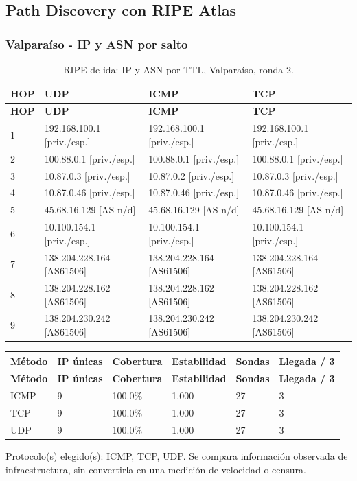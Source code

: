 \subsection{Path Discovery con RIPE Atlas}\label{sec:ripe}
\subsubsection{Valparaíso - IP y ASN por salto}
\begingroup
\fontsize{9}{11}\selectfont
\begin{longtable}{p{0.95cm}p{4.716666666666667cm}p{4.716666666666667cm}p{4.716666666666667cm}}
\caption{RIPE de ida: IP y ASN por TTL, Valparaíso, ronda 2.}\label{ripe:138.204.230.242} \\
\toprule
\textbf{HOP} & \textbf{UDP} & \textbf{ICMP} & \textbf{TCP} \\ \midrule
\endfirsthead
\toprule
\textbf{HOP} & \textbf{UDP} & \textbf{ICMP} & \textbf{TCP} \\ \midrule
\endhead
1 & 192.168.100.1 [priv./esp.] & 192.168.100.1 [priv./esp.] & 192.168.100.1 [priv./esp.] \\
2 & 100.88.0.1 [priv./esp.] & 100.88.0.1 [priv./esp.] & 100.88.0.1 [priv./esp.] \\
3 & 10.87.0.3 [priv./esp.] & 10.87.0.2 [priv./esp.] & 10.87.0.3 [priv./esp.] \\
4 & 10.87.0.46 [priv./esp.] & 10.87.0.46 [priv./esp.] & 10.87.0.46 [priv./esp.] \\
5 & 45.68.16.129 [AS n/d] & 45.68.16.129 [AS n/d] & 45.68.16.129 [AS n/d] \\
6 & 10.100.154.1 [priv./esp.] & 10.100.154.1 [priv./esp.] & 10.100.154.1 [priv./esp.] \\
7 & 138.204.228.164 [AS61506] & 138.204.228.164 [AS61506] & 138.204.228.164 [AS61506] \\
8 & 138.204.228.162 [AS61506] & 138.204.228.162 [AS61506] & 138.204.228.162 [AS61506] \\
9 & 138.204.230.242 [AS61506] & 138.204.230.242 [AS61506] & 138.204.230.242 [AS61506] \\
\bottomrule
\end{longtable}
\endgroup
\begingroup
\fontsize{9}{11}\selectfont
\addtocounter{table}{-1}
\begin{longtable}{p{3.1cm}p{1.9cm}p{2.1cm}p{2.1cm}p{1.8cm}p{2.1cm}}
\toprule
\textbf{Método} & \textbf{IP únicas} & \textbf{Cobertura} & \textbf{Estabilidad} & \textbf{Sondas} & \textbf{Llegada / 3} \\ \midrule
\endfirsthead
\toprule
\textbf{Método} & \textbf{IP únicas} & \textbf{Cobertura} & \textbf{Estabilidad} & \textbf{Sondas} & \textbf{Llegada / 3} \\ \midrule
\endhead
ICMP & 9 & 100.0\% & 1.000 & 27 & 3 \\
TCP & 9 & 100.0\% & 1.000 & 27 & 3 \\
UDP & 9 & 100.0\% & 1.000 & 27 & 3 \\
\bottomrule
\end{longtable}
\endgroup
Protocolo(s) elegido(s): ICMP, TCP, UDP. Se compara información observada de infraestructura, sin convertirla en una medición de velocidad o censura.

